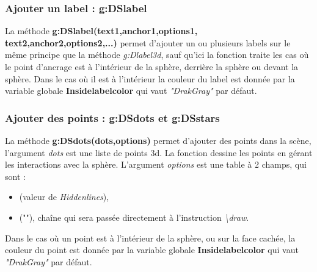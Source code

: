 \subsubsection{Ajouter un label : g:DSlabel}

La méthode \textbf{g:DSlabel(text1,anchor1,options1, text2,anchor2,options2,...)} permet d'ajouter un ou plusieurs labels sur le même principe que la méthode \emph{g:Dlabel3d}, sauf qu'ici la fonction traite les cas où le point d'ancrage est à l'intérieur de la sphère, derrière la sphère ou devant la sphère. Dans le cas où il est à l'intérieur la couleur du label est donnée par la variable globale \textbf{Insidelabelcolor} qui vaut \emph{"DrakGray"} par défaut.

\subsubsection{Ajouter des points : g:DSdots et g:DSstars}

La méthode \textbf{g:DSdots(dots,options)} permet d'ajouter des points dans la scène, l'argument \emph{dots} est une liste de points 3d. La fonction dessine les points en gérant les interactions avec la sphère. L'argument \emph{options} est une table à 2 champs, qui sont :
    \begin{itemize}
        \item {} (valeur de \emph{Hiddenlines}),
        \item {} (""), chaîne qui sera passée directement à l'instruction \emph{\textbackslash draw}.
    \end{itemize}
Dans le cas où un point est à l'intérieur de la sphère, ou sur la face cachée, la couleur du point est donnée par la variable globale \textbf{Insidelabelcolor} qui vaut \emph{"DrakGray"} par défaut.

